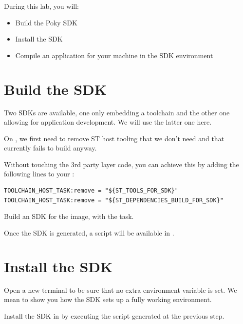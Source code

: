 
During this lab, you will:
\begin{itemize}
  \item Build the Poky SDK
  \item Install the SDK
  \item Compile an application for your machine in the SDK
    environment
\end{itemize}

\section{Build the SDK}

Two SDKs are available, one only embedding a toolchain and the
other one allowing for application development. We will use the latter one
here.

\if{}
On , we first need to remove ST host tooling that we
don't need and that currently fails to build anyway.

Without touching the  3rd party layer code, you can
achieve this by adding the following lines to your :
\begin{verbatim}
TOOLCHAIN_HOST_TASK:remove = "${ST_TOOLS_FOR_SDK}"
TOOLCHAIN_HOST_TASK:remove = "${ST_DEPENDENCIES_BUILD_FOR_SDK}"
\end{verbatim}
\fi

Build an SDK for the  image, with
the  task.

Once the SDK is generated, a script will be available in
.

\section{Install the SDK}

Open a new terminal to be sure that no extra environment variable is set.
We mean to show you how the SDK sets up a fully working environment.

Install the SDK in  by executing the script
generated at the previous step.

